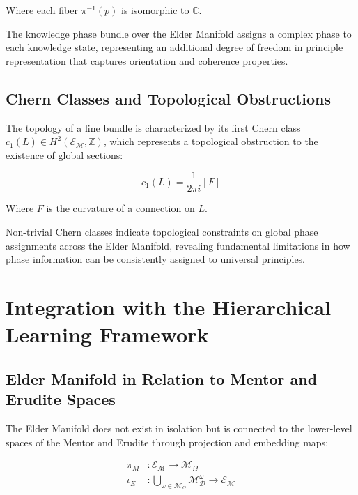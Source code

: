 Where each fiber $\pi^{-1}(p)$ is isomorphic to $\mathbb{C}$.

\begin{definition}
The knowledge phase bundle over the Elder Manifold assigns a complex phase to each knowledge state, representing an additional degree of freedom in principle representation that captures orientation and coherence properties.
\end{definition}

\subsection{Chern Classes and Topological Obstructions}

The topology of a line bundle is characterized by its first Chern class $c_1(L) \in H^2(\mathcal{E}_{\mathcal{M}}, \mathbb{Z})$, which represents a topological obstruction to the existence of global sections:

\begin{equation}
c_1(L) = \frac{1}{2\pi i}[F]
\end{equation}

Where $F$ is the curvature of a connection on $L$.

\begin{theorem}
Non-trivial Chern classes indicate topological constraints on global phase assignments across the Elder Manifold, revealing fundamental limitations in how phase information can be consistently assigned to universal principles.
\end{theorem}

\section{Integration with the Hierarchical Learning Framework}

\subsection{Elder Manifold in Relation to Mentor and Erudite Spaces}

The Elder Manifold does not exist in isolation but is connected to the lower-level spaces of the Mentor and Erudite through projection and embedding maps:

\begin{equation}
\begin{aligned}
\pi_M &: \mathcal{E}_{\mathcal{M}} \rightarrow \mathcal{M}_{\Omega} \\
\iota_E &: \bigcup_{\omega \in \mathcal{M}_{\Omega}} \mathcal{M}_{\mathcal{D}}^{\omega} \rightarrow \mathcal{E}_{\mathcal{M}}
\end{aligned}
\end{equation}

